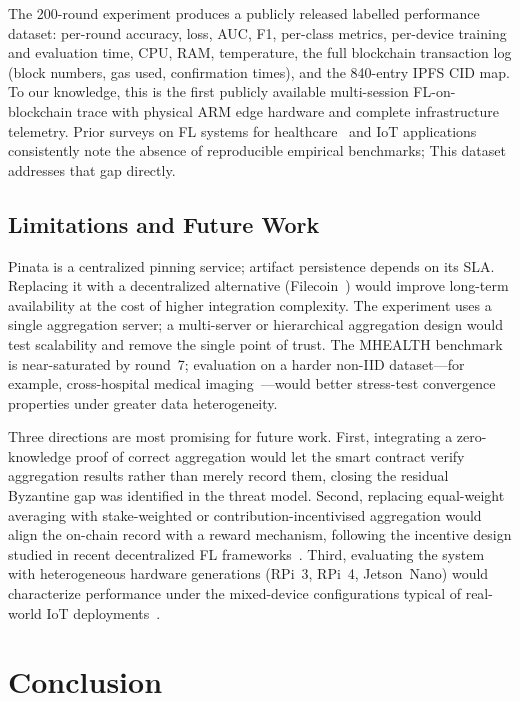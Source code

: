 \documentclass{llncs}
\begin{document}
The 200-round experiment produces a publicly released labelled performance
dataset: per-round accuracy, loss, AUC, F1, per-class metrics, per-device
training and evaluation time, CPU, RAM, temperature, the full blockchain
transaction log (block numbers, gas used, confirmation times), and the
840-entry IPFS CID map. To our knowledge, this is the first publicly
available multi-session FL-on-blockchain trace with physical ARM edge
hardware and complete infrastructure telemetry. Prior surveys on FL systems for healthcare~\cite{qammar2023securing} and IoT
applications~\cite{yang2024blockchain,issa2023survey,bayan2025permissionless}
consistently note the absence of reproducible empirical benchmarks;
This dataset addresses that gap directly.

\subsection{Limitations and Future Work}

Pinata is a centralized pinning service; artifact persistence depends on
its SLA. Replacing it with a decentralized alternative
(Filecoin~\cite{protocol2020filecoin}) would improve long-term
availability at the cost of higher integration complexity. The
experiment uses a single aggregation server; a multi-server or
hierarchical aggregation design would test scalability and remove the
single point of trust. The MHEALTH benchmark is near-saturated by
round~7; evaluation on a harder non-IID dataset---for example,
cross-hospital medical imaging~\cite{qu2022blockchain}---would better
stress-test convergence properties under greater data heterogeneity.

Three directions are most promising for future work. First, integrating
a zero-knowledge proof of correct aggregation would let the smart contract
verify aggregation results rather than merely record them, closing the
residual Byzantine gap was identified in the threat model. Second, replacing
equal-weight averaging with stake-weighted or contribution-incentivised
aggregation would align the on-chain record with a reward mechanism,
following the incentive design studied in recent decentralized FL
frameworks~\cite{beltran2026decfl,zhu2026fedERFT,bayan2024privacy}.
Third, evaluating the system with heterogeneous hardware generations
(RPi~3, RPi~4, Jetson~Nano) would characterize performance under the
mixed-device configurations typical of real-world IoT
deployments~\cite{albogamy2025iotfl,minh2025iiot}.


\FloatBarrier
\section{Conclusion}
\end{document}
